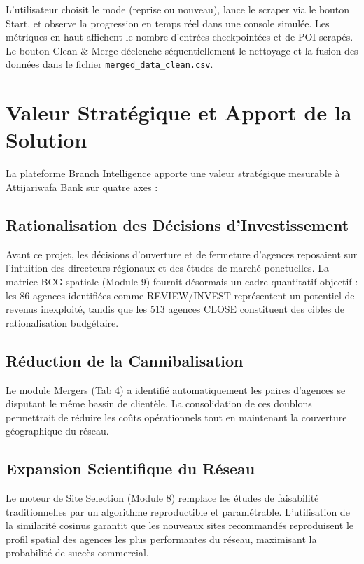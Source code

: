 \documentclass[11pt,a4paper,twoside]{report}
\begin{document}
L'utilisateur choisit le mode (reprise ou nouveau), lance le scraper via le bouton Start, et observe la progression en temps réel dans une console simulée. Les métriques en haut affichent le nombre d'entrées checkpointées et de POI scrapés. Le bouton Clean \& Merge déclenche séquentiellement le nettoyage et la fusion des données dans le fichier \texttt{merged\_data\_clean.csv}.

\section{Valeur Stratégique et Apport de la Solution}

La plateforme Branch Intelligence apporte une valeur stratégique mesurable à Attijariwafa Bank sur quatre axes :

\subsection{Rationalisation des Décisions d'Investissement}

Avant ce projet, les décisions d'ouverture et de fermeture d'agences reposaient sur l'intuition des directeurs régionaux et des études de marché ponctuelles. La matrice BCG spatiale (Module 9) fournit désormais un cadre quantitatif objectif : les 86 agences identifiées comme REVIEW/INVEST représentent un potentiel de revenus inexploité, tandis que les 513 agences CLOSE constituent des cibles de rationalisation budgétaire.

\subsection{Réduction de la Cannibalisation}

Le module Mergers (Tab 4) a identifié automatiquement les paires d'agences se disputant le même bassin de clientèle. La consolidation de ces doublons permettrait de réduire les coûts opérationnels tout en maintenant la couverture géographique du réseau.

\subsection{Expansion Scientifique du Réseau}

Le moteur de Site Selection (Module 8) remplace les études de faisabilité traditionnelles par un algorithme reproductible et paramétrable. L'utilisation de la similarité cosinus garantit que les nouveaux sites recommandés reproduisent le profil spatial des agences les plus performantes du réseau, maximisant la probabilité de succès commercial. \cite{salton1983}
\end{document}
